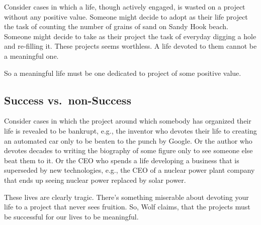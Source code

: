 \documentclass[]{article}
\begin{document}
Consider cases in which a life, though actively engaged, is wasted on a
project without any positive value. Someone might decide to adopt as
their life project the task of counting the number of grains of sand on
Sandy Hook beach. Someone might decide to take as their project the task
of everyday digging a hole and re-filling it. These projects seems
worthless. A life devoted to them cannot be a meaningful one.

So a meaningful life must be one dedicated to project of some positive
value.

\subsection{Success vs.~non-Success}\label{success-vs.non-success}

Consider cases in which the project around which somebody has organized
their life is revealed to be bankrupt, e.g., the inventor who devotes
their life to creating an automated car only to be beaten to the punch
by Google. Or the author who devotes decades to writing the biography of
some figure only to see someone else beat them to it. Or the CEO who
spends a life developing a business that is superseded by new
technologies, e.g., the CEO of a nuclear power plant company that ends
up seeing nuclear power replaced by solar power.

These lives are clearly tragic. There's something miserable about
devoting your life to a project that never sees fruition. So, Wolf
claims, that the projects must be successful for our lives to be
meaningful.
\end{document}
